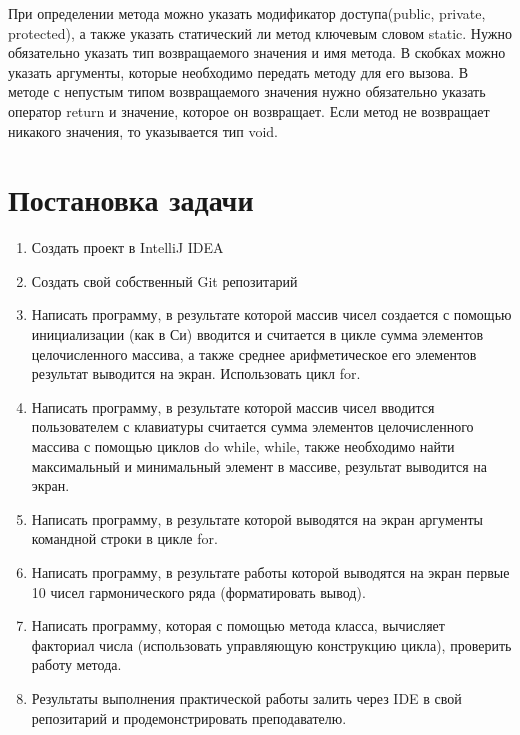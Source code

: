 \documentclass[14pt, a4paper]{extarticle}
\begin{document}
При определении метода можно указать модификатор
доступа(public, private, protected), а также указать статический ли метод
ключевым словом static. Нужно обязательно указать тип возвращаемого
значения и имя метода. В скобках можно указать аргументы, которые
необходимо передать методу для его вызова. В методе с непустым
типом возвращаемого значения нужно обязательно указать оператор
return и значение, которое он возвращает. Если метод не возвращает
никакого значения, то указывается тип void.
\section*{Постановка задачи}
\begin{enumerate}
\item Создать проект в IntelliJ IDEA
\item Создать свой собственный Git репозитарий
\item Написать программу, в результате которой массив чисел
создается с помощью инициализации (как в Си) вводится и считается в
цикле сумма элементов целочисленного массива, а также среднее
арифметическое его элементов результат выводится на экран. Использовать
цикл for.
\item Написать программу, в результате которой массив чисел вводится
пользователем с клавиатуры считается сумма элементов целочисленного
массива с помощью циклов do while, while, также необходимо найти
максимальный и минимальный элемент в массиве, результат выводится на
экран.
\item Написать программу, в результате которой выводятся на экран
аргументы командной строки в цикле for.
\item Написать программу, в результате работы которой выводятся на
экран первые 10 чисел гармонического ряда (форматировать вывод).
\item Написать программу, которая с помощью метода класса,
вычисляет факториал числа (использовать управляющую конструкцию
цикла), проверить работу метода.
\item Результаты выполнения практической работы залить через IDE в
свой репозитарий и продемонстрировать преподавателю.
\end{enumerate}
\end{document}
